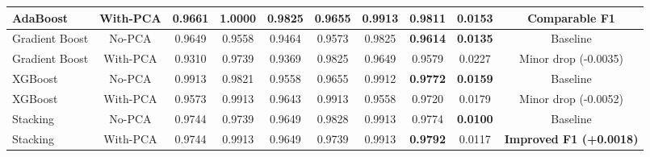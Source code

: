 \documentclass[12pt,a4paper]{article}
\begin{document}
\begin{table}[H]
{\begin{tabular}{|l|c|c|c|c|c|c|c|c|c|}
AdaBoost & With-PCA & 0.9661 & 1.0000 & 0.9825 & 0.9655 & 0.9913 & 0.9811 & \textbf{0.0153} & Comparable F1 \\ \hline
Gradient Boost & No-PCA & 0.9649 & 0.9558 & 0.9464 & 0.9573 & 0.9825 & \textbf{0.9614} & \textbf{0.0135} & Baseline \\ 
Gradient Boost & With-PCA & 0.9310 & 0.9739 & 0.9369 & 0.9825 & 0.9649 & 0.9579 & 0.0227 & Minor drop (-0.0035) \\ \hline
XGBoost & No-PCA & 0.9913 & 0.9821 & 0.9558 & 0.9655 & 0.9912 & \textbf{0.9772} & \textbf{0.0159} & Baseline \\ 
XGBoost & With-PCA & 0.9573 & 0.9913 & 0.9643 & 0.9913 & 0.9558 & 0.9720 & 0.0179 & Minor drop (-0.0052) \\ \hline
Stacking & No-PCA & 0.9744 & 0.9739 & 0.9649 & 0.9828 & 0.9913 & 0.9774 & \textbf{0.0100} & Baseline \\ 
Stacking & With-PCA & 0.9744 & 0.9913 & 0.9649 & 0.9739 & 0.9913 & \textbf{0.9792} & 0.0117 & \textbf{Improved F1 (+0.0018)} \\ \hline
\end{tabular}
}
\end{table}
\end{document}
